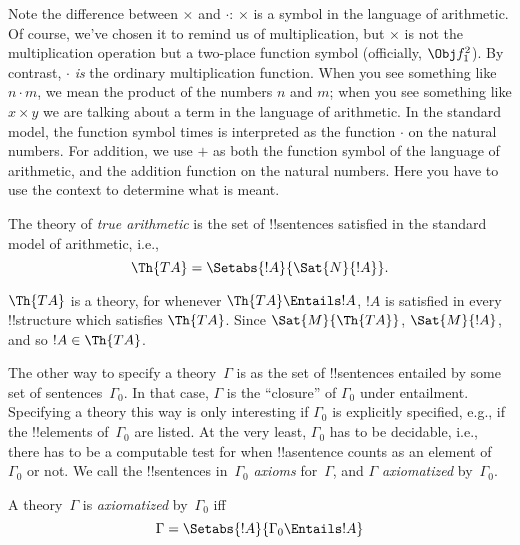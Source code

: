 \documentclass[../../../include/open-logic-section]{subfiles}
\begin{document}
Note the difference between $\times$ and $\cdot$: $\times$ is a symbol
in the language of arithmetic. Of course, we've chosen it to remind us
of multiplication, but $\times$ is not the multiplication operation
but a two-place function symbol (officially, $\Obj f^2_1$). By
contrast, $\cdot$ \emph{is} the ordinary multiplication function. When
you see something like $n \cdot m$, we mean the product of the numbers
$n$ and $m$; when you see something like $x \times y$ we are talking
about a term in the language of arithmetic. In the standard model, the
function symbol times is interpreted as the function $\cdot$ on the
natural numbers. For addition, we use $+$ as both the function symbol
of the language of arithmetic, and the addition function on the
natural numbers. Here you have to use the context to determine what is
meant.

\begin{defn}
The theory of \emph{true arithmetic} is the set of !!{sentence}s
satisfied in the standard model of arithmetic, i.e.,
\[
\Th{TA} = \Setabs{!A}{\Sat{N}{!A}}.
\]
\end{defn}

$\Th{TA}$ is a theory, for whenever $\Th{TA} \Entails !A$, $!A$ is
satisfied in every !!{structure} which satisfies $\Th{TA}$. Since
$\Sat{M}{\Th{TA}}$, $\Sat{M}{!A}$, and so $!A \in \Th{TA}$.

The other way to specify a theory~$\Gamma$ is as the set of
!!{sentence}s entailed by some set of sentences~$\Gamma_0$. In that
case, $\Gamma$ is the ``closure'' of $\Gamma_0$ under entailment.
Specifying a theory this way is only interesting if $\Gamma_0$ is
explicitly specified, e.g., if the !!{element}s of~$\Gamma_0$ are
listed. At the very least, $\Gamma_0$ has to be decidable, i.e., there
has to be a computable test for when !!a{sentence} counts as an
element of~$\Gamma_0$ or not. We call the !!{sentence}s
in~$\Gamma_0$ \emph{axioms} for~$\Gamma$, and $\Gamma$
\emph{axiomatized} by~$\Gamma_0$.

\begin{defn}
A theory~$\Gamma$ is \emph{axiomatized} by~$\Gamma_0$ iff
\[
\Gamma = \Setabs{!A}{\Gamma_0 \Entails !A}
\]
\end{defn}
\end{document}
